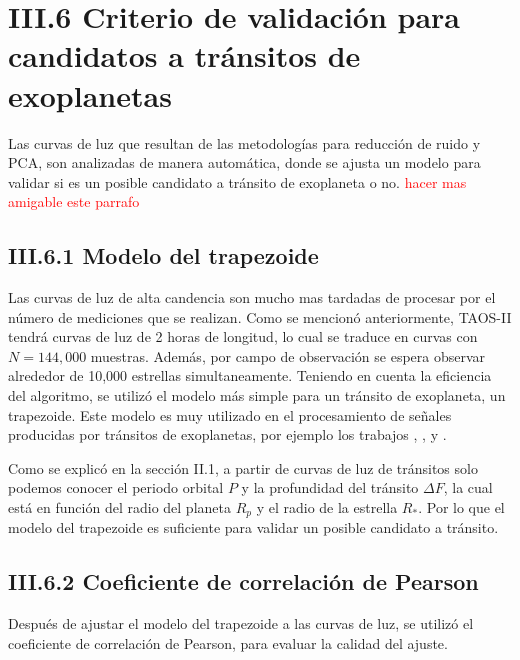 \section*{III.6 Criterio de validación para candidatos a tránsitos de exoplanetas}

Las curvas de luz que resultan de las metodologías para reducción de ruido y PCA, son analizadas de manera automática, donde se ajusta un modelo para validar si es un posible candidato a tránsito de exoplaneta o no. \textcolor{red}{hacer mas amigable este parrafo}

\subsection*{III.6.1 Modelo del trapezoide}

Las curvas de luz de alta candencia son mucho mas tardadas de procesar por el número de mediciones que se realizan. Como se mencionó anteriormente, TAOS-II tendrá curvas de luz de 2 horas de longitud, lo cual se traduce en curvas con $N=144,000$ muestras. Además, por campo de observación se espera observar alrededor de 10,000 estrellas simultaneamente. Teniendo en cuenta la eficiencia del algoritmo, se utilizó el modelo más simple para un tránsito de exoplaneta, un trapezoide. Este modelo es muy utilizado en el procesamiento de señales producidas por tránsitos de exoplanetas, por ejemplo los trabajos \cite{alapini2010transiting}, \cite{hippke2019optimized}, \cite{kipping2016observational} y \cite{morton2012efficient}.


Como se explicó en la sección II.1, a partir de curvas de luz de tránsitos solo podemos conocer el periodo orbital $P$ y la profundidad del tránsito $\Delta F$, la cual está en función del radio del planeta $R_{p}$ y el radio de la estrella $R_{*}$. Por lo que el modelo del trapezoide es suficiente para validar un posible candidato a tránsito.

\subsection*{III.6.2 Coeficiente de correlación de Pearson}

Después de ajustar el modelo del trapezoide a las curvas de luz, se utilizó el coeficiente de correlación de Pearson, para evaluar la calidad del ajuste. 

